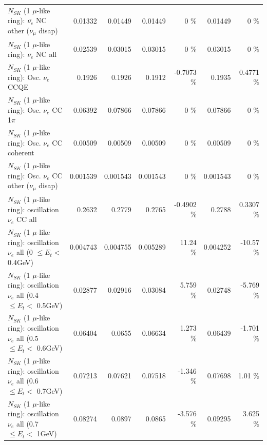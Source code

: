 \begin{table}
\begin{tabular}{| l | r | r | r  r | r  r |}
          $N_{SK}$ (1 $\mu$-like ring): $\bar{\nu_e}$ NC other ($\nu_\mu$ disap) &         0.01332 &         0.01449 &         0.01449 &        0 \%  &         0.01449 &        0 \%  \\ 
                            $N_{SK}$ (1 $\mu$-like ring): $\bar{\nu_{e}}$ NC all &         0.02539 &         0.03015 &         0.03015 &        0 \%  &         0.03015 &        0 \%  \\ 
\hline
\hline
\hline
                                 $N_{SK}$ (1 $\mu$-like ring): Osc. $\nu_e$ CCQE &          0.1926 &          0.1926 &          0.1912 &  -0.7073 \%  &          0.1935 &   0.4771 \%  \\ 
                            $N_{SK}$ (1 $\mu$-like ring): Osc. $\nu_e$ CC 1$\pi$ &         0.06392 &         0.07866 &         0.07866 &        0 \%  &         0.07866 &        0 \%  \\ 
                          $N_{SK}$ (1 $\mu$-like ring): Osc. $\nu_e$ CC coherent &         0.00509 &         0.00509 &         0.00509 &        0 \%  &         0.00509 &        0 \%  \\ 
           $N_{SK}$ (1 $\mu$-like ring): Osc. $\nu_e$ CC other ($\nu_\mu$ disap) &        0.001539 &        0.001543 &        0.001543 &        0 \%  &        0.001543 &        0 \%  \\ 
                        $N_{SK}$ (1 $\mu$-like ring): oscillation $\nu_e$ CC all &          0.2632 &          0.2779 &          0.2765 &  -0.4902 \%  &          0.2788 &   0.3307 \%  \\ 
\hline
$N_{SK}$ (1 $\mu$-like ring): oscillation $\nu_{e}$ all (0 $\leq E_{t} <$ 0.4GeV) &        0.004743 &        0.004755 &        0.005289 &    11.24 \%  &        0.004252 &   -10.57 \%  \\ 
$N_{SK}$ (1 $\mu$-like ring): oscillation $\nu_{e}$ all (0.4 $\leq E_{t} <$ 0.5GeV) &         0.02877 &         0.02916 &         0.03084 &    5.759 \%  &         0.02748 &   -5.769 \%  \\ 
$N_{SK}$ (1 $\mu$-like ring): oscillation $\nu_{e}$ all (0.5 $\leq E_{t} <$ 0.6GeV) &         0.06404 &          0.0655 &         0.06634 &    1.273 \%  &         0.06439 &   -1.701 \%  \\ 
$N_{SK}$ (1 $\mu$-like ring): oscillation $\nu_{e}$ all (0.6 $\leq E_{t} <$ 0.7GeV) &         0.07213 &         0.07621 &         0.07518 &   -1.346 \%  &         0.07698 &     1.01 \%  \\ 
$N_{SK}$ (1 $\mu$-like ring): oscillation $\nu_{e}$ all (0.7 $\leq E_{t} <$ 1GeV) &         0.08274 &          0.0897 &          0.0865 &   -3.576 \%  &         0.09295 &    3.625 \%  \\ 

\end{tabular}
\end{table}
